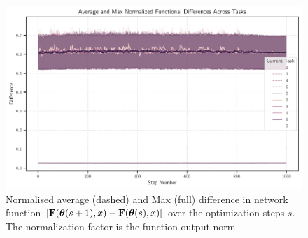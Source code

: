 \documentclass{article} %
\begin{document}
\begin{figure}
    \centering
    \includegraphics[width=0.7\linewidth]{figures/functional_differences_all_tasks_olddata_normalised.pdf}
    \caption{Normalised average (dashed) and Max (full) difference in network function $|\mbox{$\mbox{$\mathbf{F}$}$}(\mbox{$\mbox{$\boldsymbol{\theta}$}$}(s+1),x) - \mbox{$\mbox{$\mathbf{F}$}$}(\mbox{$\mbox{$\boldsymbol{\theta}$}$}(s),x)|$ over the optimization steps $s$. The normalization factor is the function output norm.}
    \label{fig:func_diff_norm}
\end{figure}
\end{document}

